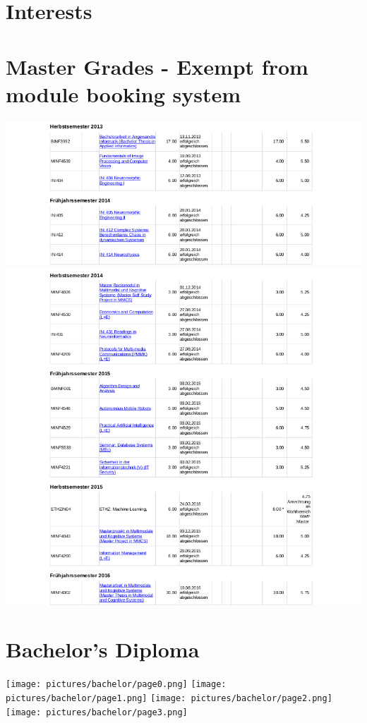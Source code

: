 \section{Interests}

\renewcommand{\listitemsymbol}{-~} %


\section{Master Grades - Exempt from module booking system}
\includegraphics[width=\textwidth]{pictures/master/module1.png}
\includegraphics[width=\textwidth]{pictures/master/module2.png}

\enlargethispage{12pt}
\newpage
\section{Bachelor's Diploma}
\texttt{[image: pictures/bachelor/page0.png]}
\texttt{[image: pictures/bachelor/page1.png]}
\texttt{[image: pictures/bachelor/page2.png]}
\texttt{[image: pictures/bachelor/page3.png]}

\restoregeometry
